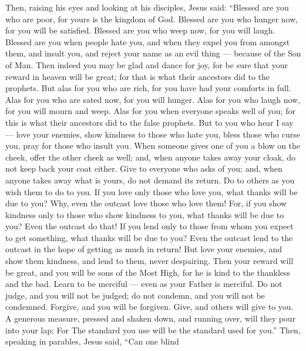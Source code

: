  Then, raising his eyes and looking at his disciples, Jesus
said: ``Blessed are you who are poor, for yours is the kingdom of God.
 Blessed are you who hunger now, for you will be satisfied.
Blessed are you who weep now, for you will laugh.  Blessed
are you when people hate you, and when they expel you from amongst them,
and insult you, and reject your name as an evil thing --- because of the
Son of Man.  Then indeed you may be glad and dance for joy,
for be sure that your reward in heaven will be great; for that is what
their ancestors did to the prophets.  But alas for you who
are rich, for you have had your comforts in full.  Alas for
you who are sated now, for you will hunger. Alas for you who laugh now,
for you will mourn and weep.  Alas for you when everyone
speaks well of you; for this is what their ancestors did to the false
prophets.  But to you who hear I say --- love your enemies,
show kindness to those who hate you,  bless those who curse
you, pray for those who insult you.  When someone gives one
of you a blow on the cheek, offer the other cheek as well; and, when
anyone takes away your cloak, do not keep back your coat either.
 Give to everyone who asks of you; and, when anyone takes
away what is yours, do not demand its return.  Do to others
as you wish them to do to you.  If you love only those who
love you, what thanks will be due to you? Why, even the outcast love
those who love them!  For, if you show kindness only to
those who show kindness to you, what thanks will be due to you? Even the
outcast do that!  If you lend only to those from whom you
expect to get something, what thanks will be due to you? Even the
outcast lend to the outcast in the hope of getting as much in return!
 But love your enemies, and show them kindness, and lend to
them, never despairing. Then your reward will be great, and you will be
sons of the Most High, for he is kind to the thankless and the bad.
 Learn to be merciful --- even as your Father is merciful.
 Do not judge, and you will not be judged; do not condemn,
and you will not be condemned. Forgive, and you will be forgiven.
 Give, and others will give to you. A generous measure,
pressed and shaken down, and running over, will they pour into your lap;
For The standard you use will be the standard used for you.''
 Then, speaking in parables, Jesus said, ``Can one blind
